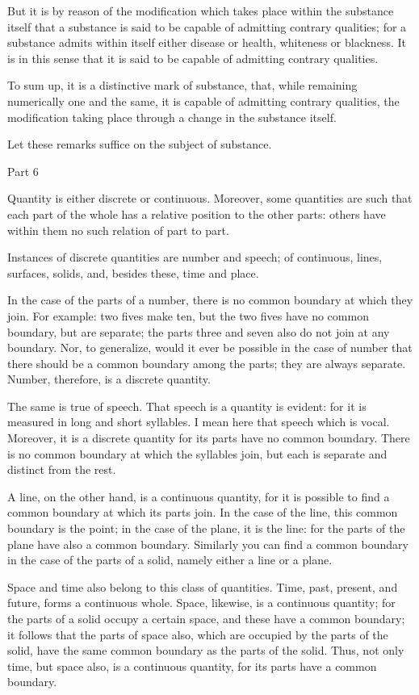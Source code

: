 But it is by reason of the modification which takes place within the
substance itself that a substance is said to be capable of admitting
contrary qualities; for a substance admits within itself either disease
or health, whiteness or blackness. It is in this sense that it is said
to be capable of admitting contrary qualities.

To sum up, it is a distinctive mark of substance, that, while remaining
numerically one and the same, it is capable of admitting contrary
qualities, the modification taking place through a change in the
substance itself.

Let these remarks suffice on the subject of substance.



Part 6

Quantity is either discrete or continuous. Moreover, some quantities
are such that each part of the whole has a relative position to the
other parts: others have within them no such relation of part to part.

Instances of discrete quantities are number and speech; of continuous,
lines, surfaces, solids, and, besides these, time and place.

In the case of the parts of a number, there is no common boundary at
which they join. For example: two fives make ten, but the two fives
have no common boundary, but are separate; the parts three and seven
also do not join at any boundary. Nor, to generalize, would it ever be
possible in the case of number that there should be a common boundary
among the parts; they are always separate. Number, therefore, is a
discrete quantity.

The same is true of speech. That speech is a quantity is evident: for
it is measured in long and short syllables. I mean here that speech
which is vocal. Moreover, it is a discrete quantity for its parts have
no common boundary. There is no common boundary at which the syllables
join, but each is separate and distinct from the rest.

A line, on the other hand, is a continuous quantity, for it is possible
to find a common boundary at which its parts join. In the case of the
line, this common boundary is the point; in the case of the plane, it
is the line: for the parts of the plane have also a common boundary.
Similarly you can find a common boundary in the case of the parts of a
solid, namely either a line or a plane.

Space and time also belong to this class of quantities. Time, past,
present, and future, forms a continuous whole. Space, likewise, is a
continuous quantity; for the parts of a solid occupy a certain space,
and these have a common boundary; it follows that the parts of space
also, which are occupied by the parts of the solid, have the same
common boundary as the parts of the solid. Thus, not only time, but
space also, is a continuous quantity, for its parts have a common
boundary.


